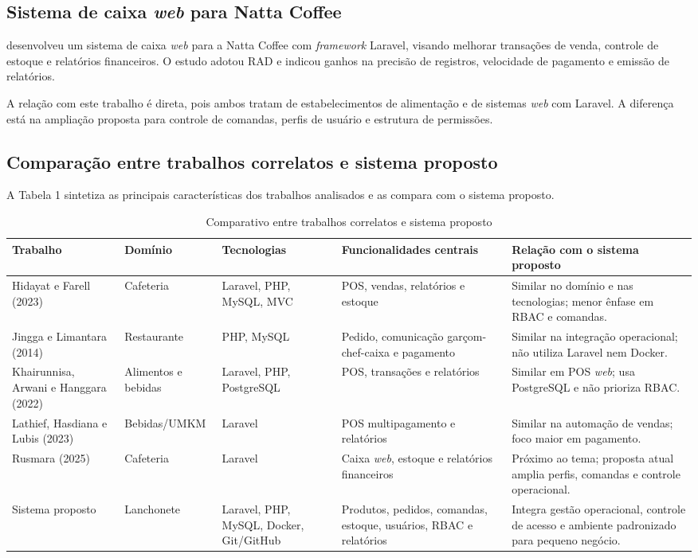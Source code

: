 \subsection{Sistema de caixa \textit{web} para Natta Coffee}

 desenvolveu um sistema de caixa \textit{web} para a Natta Coffee com \textit{framework} Laravel, visando melhorar transações de venda, controle de estoque e relatórios financeiros. O estudo adotou RAD e indicou ganhos na precisão de registros, velocidade de pagamento e emissão de relatórios.

A relação com este trabalho é direta, pois ambos tratam de estabelecimentos de alimentação e de sistemas \textit{web} com Laravel. A diferença está na ampliação proposta para controle de comandas, perfis de usuário e estrutura de permissões.

\subsection{Comparação entre trabalhos correlatos e sistema proposto}

A Tabela 1 sintetiza as principais características dos trabalhos analisados e as compara com o sistema proposto.

\begin{table}[htbp]
\centering
\caption{Comparativo entre trabalhos correlatos e sistema proposto}
\label{tab:trabalhos-correlatos}
\scriptsize
\begin{tabularx}{\textwidth}{p{2.1cm}p{2.3cm}p{2.4cm}p{3.1cm}X}
\hline
\textbf{Trabalho} & \textbf{Domínio} & \textbf{Tecnologias} & \textbf{Funcionalidades centrais} & \textbf{Relação com o sistema proposto} \\
\hline
Hidayat e Farell (2023) & Cafeteria & Laravel, PHP, MySQL, MVC & POS, vendas, relatórios e estoque & Similar no domínio e nas tecnologias; menor ênfase em RBAC e comandas. \\
\hline
Jingga e Limantara (2014) & Restaurante & PHP, MySQL & Pedido, comunicação garçom-chef-caixa e pagamento & Similar na integração operacional; não utiliza Laravel nem Docker. \\
\hline
Khairunnisa, Arwani e Hanggara (2022) & Alimentos e bebidas & Laravel, PHP, PostgreSQL & POS, transações e relatórios & Similar em POS \textit{web}; usa PostgreSQL e não prioriza RBAC. \\
\hline
Lathief, Hasdiana e Lubis (2023) & Bebidas/UMKM & Laravel & POS multipagamento e relatórios & Similar na automação de vendas; foco maior em pagamento. \\
\hline
Rusmara (2025) & Cafeteria & Laravel & Caixa \textit{web}, estoque e relatórios financeiros & Próximo ao tema; proposta atual amplia perfis, comandas e controle operacional. \\
\hline
Sistema proposto & Lanchonete & Laravel, PHP, MySQL, Docker, Git/GitHub & Produtos, pedidos, comandas, estoque, usuários, RBAC e relatórios & Integra gestão operacional, controle de acesso e ambiente padronizado para pequeno negócio. \\
\hline
\end{tabularx}
\end{table}

